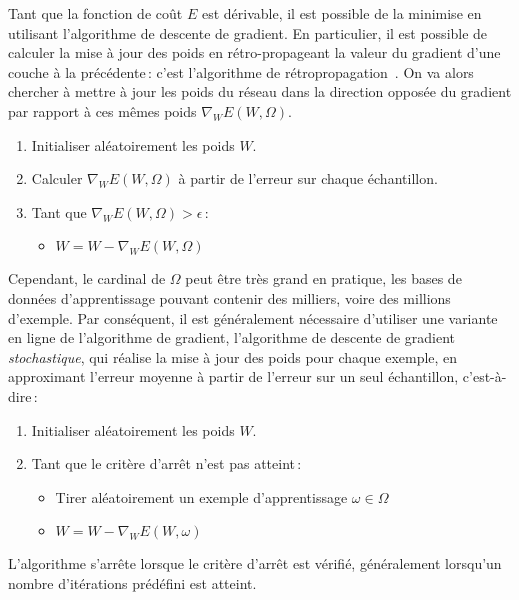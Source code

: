 Tant que la fonction de coût $E$ est dérivable, il est possible de la minimise en utilisant l'algorithme de descente de gradient. En particulier, il est possible de calculer la mise à jour des poids en rétro-propageant la valeur du gradient d'une couche à la précédente\,: c'est l'algorithme de rétropropagation~\cite{werbos_beyond_1975,lecun_efficient_1998,rumelhart_learning_1986}. On va alors chercher à mettre à jour les poids du réseau dans la direction opposée du gradient par rapport à ces mêmes poids $\nabla_W E(W, \Omega)$.

\begin{theorem}
  \begin{enumerate}
    \item Initialiser aléatoirement les poids $W$.
    \item Calculer $\nabla_W E(W, \Omega)$ à partir de l'erreur sur chaque échantillon.
    \item Tant que $\nabla_W E(W, \Omega) > \epsilon$\,:
      \begin{itemize}
          \item $W = W - \nabla_W E(W, \Omega)$
      \end{itemize}
  \end{enumerate}
\end{theorem}

 Cependant, le cardinal de $\Omega$ peut être très grand en pratique, les bases de données d'apprentissage pouvant contenir des milliers, voire des millions d'exemple. Par conséquent, il est généralement nécessaire d'utiliser une variante en ligne de l'algorithme de gradient, l'algorithme de descente de gradient \emph{stochastique}, qui réalise la mise à jour des poids pour chaque exemple, en approximant l'erreur moyenne à partir de l'erreur sur un seul échantillon, c'est-à-dire\,:
\begin{theorem}
  \begin{enumerate}
    \item Initialiser aléatoirement les poids $W$.
    \item Tant que le critère d'arrêt n'est pas atteint\,:
      \begin{itemize}
          \item Tirer aléatoirement un exemple d'apprentissage $\omega \in \Omega$
          \item $W = W - \nabla_W E(W, \omega)$
      \end{itemize}
  \end{enumerate}
L'algorithme s'arrête lorsque le critère d'arrêt est vérifié, généralement lorsqu'un nombre d'itérations prédéfini est atteint.
\end{theorem}

